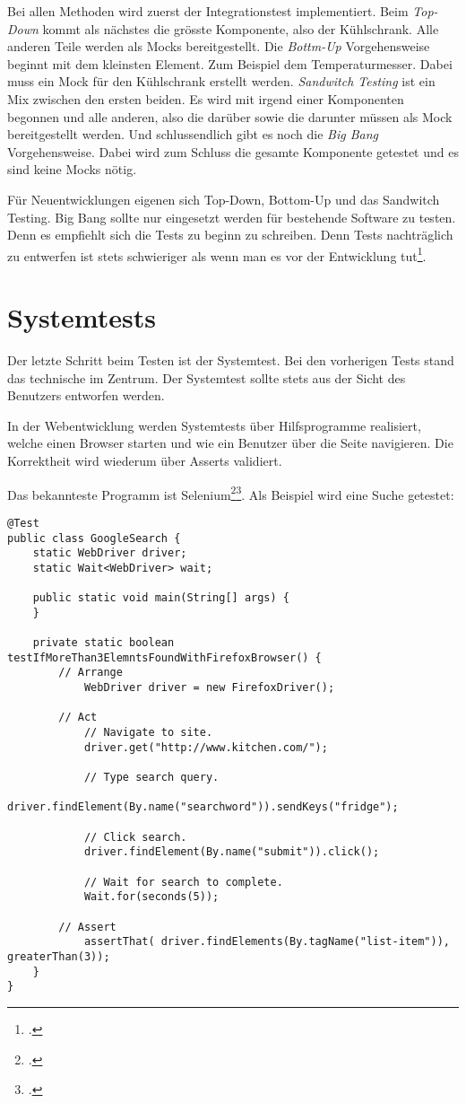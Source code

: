 Bei allen Methoden wird zuerst der Integrationstest implementiert. Beim \textit{Top-Down} kommt als nächstes die grösste Komponente, also der Kühlschrank. Alle anderen Teile werden als Mocks bereitgestellt. Die \textit{Bottm-Up} Vorgehensweise beginnt mit dem kleinsten Element. Zum Beispiel dem Temperaturmesser. Dabei muss ein Mock für den Kühlschrank erstellt werden. \textit{Sandwitch Testing} ist ein Mix zwischen den ersten beiden. Es wird mit irgend einer Komponenten begonnen und alle anderen, also die darüber sowie die darunter müssen als Mock bereitgestellt werden. Und schlussendlich gibt es noch die \textit{Big Bang} Vorgehensweise. Dabei wird zum Schluss die gesamte Komponente getestet und es sind keine Mocks nötig. 

Für Neuentwicklungen eigenen sich Top-Down, Bottom-Up und das Sandwitch Testing. Big Bang sollte nur eingesetzt werden für bestehende Software zu testen. Denn es empfiehlt sich die Tests zu beginn zu schreiben. Denn Tests nachträglich zu entwerfen ist stets schwieriger als wenn man es vor der Entwicklung tut\footcite{Madeyski10cpdf_2015-06-07}.

\section{Systemtests}
Der letzte Schritt beim Testen ist der Systemtest. Bei den vorherigen Tests stand das technische im Zentrum. Der Systemtest sollte stets aus der Sicht des Benutzers entworfen werden.

In der Webentwicklung werden Systemtests über Hilfsprogramme realisiert, welche einen Browser starten und wie ein Benutzer über die Seite navigieren. Die Korrektheit wird wiederum über Asserts validiert.

Das bekannteste Programm ist Selenium\footcite{Selenium_-_Web_Browser_Automation_2015-06-07}\footcite{The_Art_of_Unit_Testing}. Als Beispiel wird eine Suche getestet: 

\begin{lstlisting}
@Test
public class GoogleSearch {
    static WebDriver driver;
    static Wait<WebDriver> wait;
 
    public static void main(String[] args) {
    }
 
    private static boolean testIfMoreThan3ElemntsFoundWithFirefoxBrowser() {
        // Arrange
	        WebDriver driver = new FirefoxDriver();
        
        // Act
        	// Navigate to site.
        	driver.get("http://www.kitchen.com/");
        	        
	        // Type search query.
	        driver.findElement(By.name("searchword")).sendKeys("fridge");
	 
	        // Click search.
	        driver.findElement(By.name("submit")).click();
	 
	        // Wait for search to complete.
	        Wait.for(seconds(5));
 
        // Assert
        	assertThat( driver.findElements(By.tagName("list-item")), greaterThan(3));
    }
}
\end{lstlisting}

